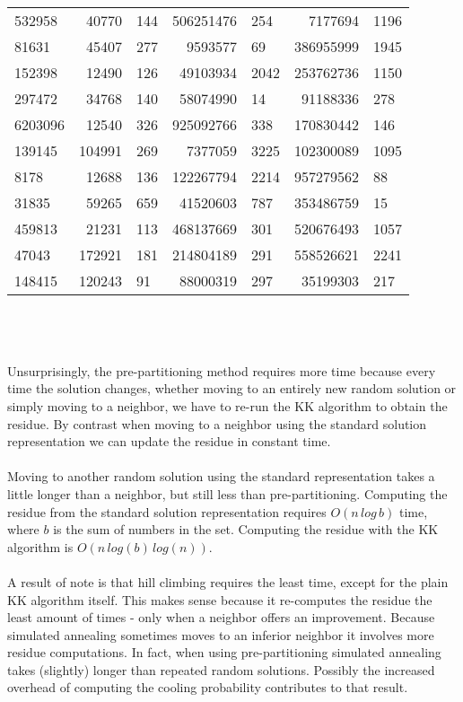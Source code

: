 \documentclass[11pt]{article}
\begin{document}
\begin{tabular}{l r l r l r l}
532958 & 40770 & 144 & 506251476 & 254 & 7177694 & 1196 \\
81631 & 45407 & 277 & 9593577 & 69 & 386955999 & 1945 \\
152398 & 12490 & 126 & 49103934 & 2042 & 253762736 & 1150 \\
297472 & 34768 & 140 & 58074990 & 14 & 91188336 & 278 \\
6203096 & 12540 & 326 & 925092766 & 338 & 170830442 & 146 \\
139145 & 104991 & 269 & 7377059 & 3225 & 102300089 & 1095 \\
8178 & 12688 & 136 & 122267794 & 2214 & 957279562 & 88 \\
31835 & 59265 & 659 & 41520603 & 787 & 353486759 & 15 \\
459813 & 21231 & 113 & 468137669 & 301 & 520676493 & 1057 \\
47043 & 172921 & 181 & 214804189 & 291 & 558526621 & 2241 \\
148415 & 120243 & 91 & 88000319 & 297 & 35199303 & 217 \\
\end{tabular}
\\
\\
\\
Unsurprisingly, the pre-partitioning method requires more time because every time the solution changes, whether moving to an entirely new random solution or simply moving to a neighbor, we have to re-run the KK algorithm to obtain the residue. By contrast when moving to a neighbor using the standard solution representation we can update the residue in constant time.\\
\\
Moving to another random solution using the standard representation takes a little longer than a neighbor, but still less than pre-partitioning. Computing the residue from the standard solution representation requires $O(n\,log\,b)$ time, where $b$ is the sum of numbers in the set. Computing the residue with the KK algorithm is $O(n\, log(b)\,log(n))$. \\
\\
A result of note is that hill climbing requires the least time, except for the plain KK algorithm itself. This makes sense because it re-computes the residue the least amount of times - only when a neighbor offers an improvement. Because simulated annealing sometimes moves to an inferior neighbor it involves more residue computations. In fact, when using pre-partitioning simulated annealing takes (slightly) longer than repeated random solutions. Possibly the increased overhead of computing the cooling probability contributes to that result. \\
\end{document}

